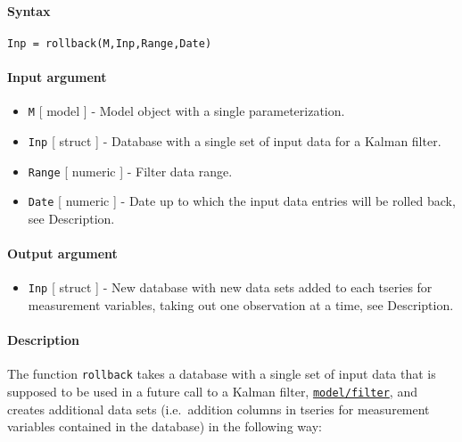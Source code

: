


	\paragraph{Syntax}

\begin{verbatim}
Inp = rollback(M,Inp,Range,Date)
\end{verbatim}

\paragraph{Input argument}

\begin{itemize}
\item
  \texttt{M} {[} model {]} - Model object with a single
  parameterization.
\item
  \texttt{Inp} {[} struct {]} - Database with a single set of input data
  for a Kalman filter.
\item
  \texttt{Range} {[} numeric {]} - Filter data range.
\item
  \texttt{Date} {[} numeric {]} - Date up to which the input data
  entries will be rolled back, see Description.
\end{itemize}

\paragraph{Output argument}

\begin{itemize}
\itemsep1pt\parskip0pt
\item
  \texttt{Inp} {[} struct {]} - New database with new data sets added to
  each tseries for measurement variables, taking out one observation at
  a time, see Description.
\end{itemize}

\paragraph{Description}

The function \texttt{rollback} takes a database with a single set of
input data that is supposed to be used in a future call to a Kalman
filter, \href{model/filter}{\texttt{model/filter}}, and creates
additional data sets (i.e.~addition columns in tseries for measurement
variables contained in the database) in the following way:

